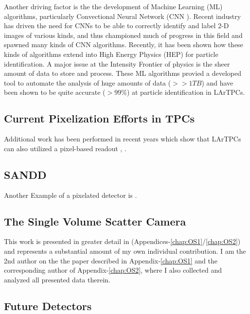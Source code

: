\citep{Sadowski_2017}
Another driving factor is the the development of Machine Learning (ML) algorithms, particularly Convectional Neural Network (CNN \citep{Sadowski2017DeepLI}).
Recent industry has driven the need for CNNs to be able to correctly identify and label 2-D images of various kinds, and thus championed much of progress in this field and spawned many kinds of CNN algorithms. 
Recently, it has been shown how these kinds of algorithms extend into High Energy Physics (HEP) for particle identification.
A major issue at the Intensity Frontier of physics is the sheer amount of data to store and process. 
These ML algorithms provied a developed tool to automate the analysis of huge amounts of data ($>> 1 TB$) and have been shown to be quite accurate ($>99\%$) at particle identification in LArTPCs.

\subsection{Current Pixelization Efforts in TPCs}


Additional work has been performed in recent years which show that LArTPCs can also utilized a pixel-based readout \citep{larpix:Dwyer_2018}, \citep{Asaadi_2018}.

\subsection{SANDD}

Another Example of a pixelated detector is \citep{SUTANTO2021_sandd_165409}.


\subsection{The Single Volume Scatter Camera}

This work is presented in greater detail in (Appendices-\ref{chap:OS1}/\ref{chap:OS2}) and represents a substantial amount of my own individual contribution. 
I am the 2nd author on the the paper described in Appendix-\ref{chap:OS1} and the corresponding author of Appendix-\ref{chap:OS2}, where I also collected and analyzed all presented data therein.

\subsection{Future Detectors}

